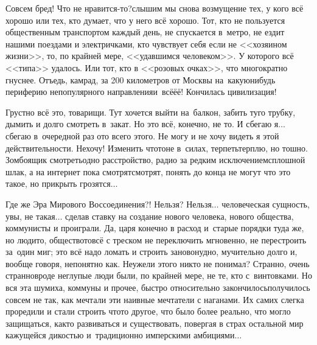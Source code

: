 \diagdash Совсем бред! Что не нравится-то?\mdash слышим мы снова возмущение тех, у кого всё хорошо или тех, кто думает, что у него всё хорошо. Тот, кто не пользуется общественным транспортом каждый день, не спускается в~метро, не ездит нашими поездами и электричками, кто чувствует себя если не <<хозяином жизни>>, то, по крайней мере, <<удавшимся человеком>>. У которого всё <<типа>> удалось. Или тот, кто в <<розовых очках>>, что многократно гнуснее. Отъедь, камрад, за 200 километров от Москвы на~какую\sdash нибудь периферию непопулярного направления\mdash и~всё\sdash ё\sdash ё! Кончилась цивилизация!

Грустно всё это, товарищи. Тут хочется выйти на~балкон, забить туго трубку, дымить и долго смотреть в~закат. Но это всё, конечно, не то. И сбегаю я$\ldots$ сбегаю в~очередной раз ото всего этого. Не могу и не хочу видеть я этой действительности. Не\sdash хо\sdash чу! Изменить что\sdash то\mdash не в~силах, терпеть\mdash терплю, но тошно. Зомбоящик смотреть\mdash одно расстройство, радио
за редким исключением\mdash сплошной шлак, а на интернет пока смотрят\sdash смотрят, понять до конца не могут что это такое, но прикрыть грозятся$\ldots$

Где же Эра Мирового Воссоединения?! Нельзя? Нельзя$\ldots$ человеческая сущность, увы, не такая$\ldots$ сделав ставку на создание нового человека, нового общества, коммунисты и проиграли. Да, царя конечно в расход и~старые порядки туда же, но люди\sdash то, общество\sdash то\mdash всё с треском не переключить мгновенно, не перестроить за~один миг; это всё надо ломать и строить заново\mdash нудно, мучительно долго и, вообще говоря, непонятно как. Неужели этого никто не понимал? Странно, очень странно\mdash вроде неглупые люди были, по крайней мере, не те, кто с~винтовками. Но вся эта шумиха, коммуны и прочее, быстро относительно закончилось\mdash получилось совсем не так, как мечтали эти наивные мечтатели с наганами. Их самих слегка проредили и стали строить что\sdash то другое, что было более реально, что могло защищаться, как\sdash то развиваться и существовать, повергая в страх остальной мир кажущейся дикостью и~традиционно имперскими амбициями$\ldots$

